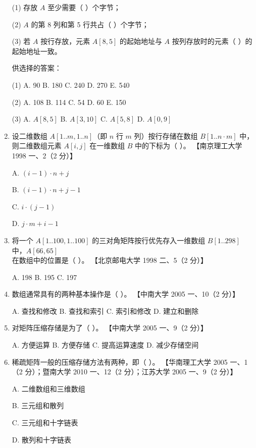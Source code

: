 \documentclass[lang=cn,newtx,10pt,scheme=chinese]{../../elegantbook}
\begin{document}
\begin{enumerate}
    (1) 存放 $A$ 至少需要（ ）个字节；  

    (2) $A$ 的第 8 列和第 5 行共占（ ）个字节；  

    (3) 若 $A$ 按行存放，元素 $A[8,5]$ 的起始地址与 $A$ 按列存放时的元素（ ）的起始地址一致。  

    供选择的答案：  

    (1) A. 90 \quad B. 180 \quad C. 240 \quad D. 270 \quad E. 540  

    (2) A. 108 \quad B. 114 \quad C. 54 \quad D. 60 \quad E. 150  

    (3) A. $A[8,5]$ \quad B. $A[3,10]$ \quad C. $A[5,8]$ \quad D. $A[0,9]$  

    \item 设二维数组 $A[1..m, 1..n]$（即 $n$ 行 $m$ 列）按行存储在数组 $B[1..n \cdot m]$ 中，则二维数组元素 $A[i,j]$ 在一维数组 $B$ 中的下标为（ ）。  
    【南京理工大学 1998 一、2（2 分）】  

    A. $(i-1) \cdot n + j$  

    B. $(i-1) \cdot n + j - 1$  

    C. $i \cdot (j - 1)$  

    D. $j \cdot m + i - 1$  

    \item 将一个 $A[1..100, 1..100]$ 的三对角矩阵按行优先存入一维数组 $B[1..298]$ 中，$A[66,65]$ 在数组中的位置是（ ）。  
    【北京邮电大学 1998 二、5（2 分）】  

    A. 198 \quad B. 195 \quad C. 197  

    \item 数组通常具有的两种基本操作是（ ）。  
    【中南大学 2005 一、10（2 分）】  

    A. 查找和修改 \quad B. 查找和索引 \quad C. 索引和修改 \quad D. 建立和删除  

    \item 对矩阵压缩存储是为了（ ）。  
    【中南大学 2005 一、9（2 分）】  

    A. 方便运算 \quad B. 方便存储 \quad C. 提高运算速度 \quad D. 减少存储空间  

    \item 稀疏矩阵一般的压缩存储方法有两种，即（ ）。  
    【华南理工大学 2005 一、1（2 分）；暨南大学 2010 一、12（2 分）；江苏大学 2005 一、9（2 分）】  

    A. 二维数组和三维数组  

    B. 三元组和散列  

    C. 三元组和十字链表  

    D. 散列和十字链表  


\end{enumerate}
\end{document}
